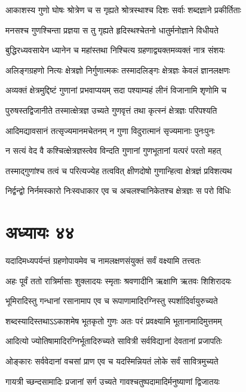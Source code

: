 \twolineshloka
{आकाशस्य गुणो घोषः श्रोत्रेण च स गृह्यते}
{श्रोत्रस्थाश्च दिशः सर्वाः शब्दज्ञाने प्रकीर्तिताः}


\twolineshloka
{मनसश्च गुणश्चिन्ता प्रज्ञया स तु गृह्यते}
{हृदिस्थश्चेतनो धातुर्मनोज्ञाने विधीयते}


\twolineshloka
{बुद्धिरध्यवसायेन ध्यानेन च महांस्तथा}
{निश्चित्य ग्रहणाद्व्यक्तमव्यक्तं नात्र संशयः}


\twolineshloka
{अलिङ्गग्रहणो नित्यः क्षेत्रज्ञो निर्गुणात्मकः}
{तस्मादलिङ्गः क्षेत्रज्ञः केवलं ज्ञानलक्षणः}


\twolineshloka
{अव्यक्तं क्षेत्रमुद्दिष्टं गुणानां प्रभवाप्ययम्}
{सदा पश्याम्यहं लीनं विजानामि शृणोमि च}


\twolineshloka
{पुरुषस्तद्विजानीते तस्मात्क्षेत्रज्ञ उच्यते}
{गुणवृत्तं तथा कृत्स्नं क्षेत्रज्ञः परिपश्यति}


\twolineshloka
{आदिमद्यावसानं तत्सृज्यमानमचेतनम्}
{न गुणा विदुरात्मानं सृज्यमानाः पुनःपुनः}


\twolineshloka
{न सत्यं वेद वै कश्चित्क्षेत्रज्ञस्त्वेव विन्दति}
{गुणानां गुणभूतानां यत्परं परतो महत्}


\twolineshloka
{तस्माद्गुणांश्च तत्वं च परित्यज्येह तत्ववित्}
{क्षीणदोषो गुणान्हित्वा क्षेत्रज्ञं प्रविशत्यथ}


\twolineshloka
{निर्द्वन्द्वो निर्नमस्कारो निःस्वधाकार एव च}
{अचलश्चानिकेतश्च क्षेत्रज्ञः स परो विधिः}


\chapter{अध्यायः ४४}
\twolineshloka
{यदादिमध्यपर्यन्तं ग्रहणोपायमेव च}
{नामलक्षणसंयुक्तं सर्वं वक्ष्यामि तत्त्वतः}


\twolineshloka
{अहः पूर्वं ततो रात्रिर्मासाः शुक्लादयः स्मृताः}
{श्रवणादीनि ऋक्षाणि ऋतवः शिशिरादयः}


\twolineshloka
{भूमिरादिस्तु गन्धानां रसानामाप एव च}
{रूपाणामादिरग्निस्तु स्पर्शादिर्वायुरुच्यते}


\twolineshloka
{शब्दस्यादिस्तथाऽऽकाशमेष भूतकृतो गुणः}
{अतः परं प्रवक्ष्यामि भूतानामादिमुत्तमम्}


\twolineshloka
{आदित्यो ज्योतिषामादिरग्निर्भूतादिरुच्यते}
{सावित्री सर्वविद्यानां देवतानां प्रजापतिः}


\twolineshloka
{ओङ्कारः सर्ववेदानां वचसां प्राण एव च}
{यदस्मिन्नियतं लोके सर्वं सावित्रमुच्यते}


\twolineshloka
{गायत्री च्छन्दसामादिः प्रजानां सर्ग उच्यते}
{गावश्चतुष्पदामादिर्मनुष्याणां द्विजातयः}


